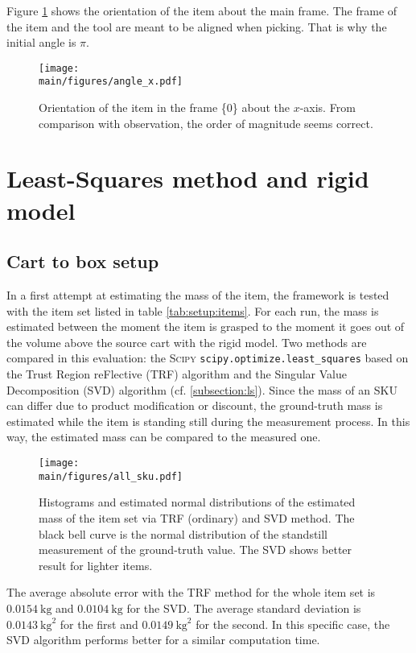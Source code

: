 \documentclass[/home/francois/latex/report/main.tex]{subfiles}
\begin{document}
Figure \ref{fig:results:calibration:angle} shows the orientation of the item about the main frame. The frame of the item and the tool are meant to be aligned when picking. That is why the initial angle is $\pi$.

\begin{figure}
  \centering
  \texttt{[image: \\main/figures/angle\_x.pdf]}
  \caption{Orientation of the item in the frame \{0\} about the $x$-axis. From comparison with observation, the order of magnitude seems correct.}
  \label{fig:results:calibration:angle}
\end{figure}

\section{Least-Squares method and rigid model}

\subsection{Cart to box setup}

In a first attempt at estimating the mass of the item, the framework is tested with the item set listed in table \ref{tab:setup:items}. For each run, the mass is estimated between the moment the item is grasped to the moment it goes out of the volume above the source cart with the rigid model. Two methods are compared in this evaluation: the \textsc{Scipy} \texttt{scipy.optimize.least\_squares} based on the Trust Region reFlective (TRF) algorithm and the Singular Value Decomposition (SVD) algorithm (cf. \ref{subsection:ls}). Since the mass of an \ac{SKU} can differ due to product modification or discount, the ground-truth mass is estimated while the item is standing still during the measurement process. In this way, the estimated mass can be compared to the measured one.

\begin{figure}
  \centering
  \texttt{[image: \\main/figures/all\_sku.pdf]}
  \caption{Histograms and estimated normal distributions of the estimated mass of the item set via \ac{TRF} (ordinary) and \ac{SVD} method. The black bell curve is the normal distribution of the standstill measurement of the ground-truth value. The \ac{SVD} shows better result for lighter items.}
  \label{fig:results:rigid-ls}
\end{figure}

The average absolute error with the \ac{TRF} method for the whole item set is $0.0154 \ \si{\kilogram}$ and $0.0104 \ \si{\kilogram}$ for the \ac{SVD}. The average standard deviation is $0.0143 \ \si{\kilogram\squared}$ for the first and $0.0149 \ \si{\kilogram\squared}$ for the second. In this specific case, the \ac{SVD} algorithm performs better for a similar computation time.
\end{document}
